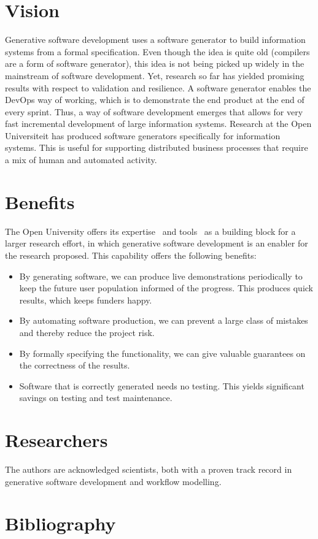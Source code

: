 \documentclass{elsarticle}
\begin{document}
\section{Vision}
   Generative software development uses a software generator to build information systems from a formal specification.
   Even though the idea is quite old (compilers are a form of software generator),
   this idea is not being picked up widely in the mainstream of software development.
   Yet, research so far has yielded promising results with respect to validation and resilience.
   A software generator enables the DevOps way of working, which is to demonstrate the end product at the end of every sprint.
   Thus, a way of software development emerges that allows for very fast incremental development of large information systems.
   Research at the Open Universiteit has produced software generators specifically for information systems.
   This is useful for supporting distributed business processes that require a mix of human and automated activity.

\section{Benefits}
    The Open University offers its expertise~\cite{JoostenRAMiCS2017,Steenvoorden2022} and tools~\cite{Joosten-JLAMP2018,10.1145/3354166.3354182} as a building block for a larger research effort,
    in which generative software development is an enabler for the research proposed.
    This capability offers the following benefits:
\begin{itemize}
    \item By generating software, we can produce live demonstrations periodically to keep the future user population informed of the progress.
    This produces quick results, which keeps funders happy.
    \item By automating software production, we can prevent a large class of mistakes and thereby reduce the project risk.
    \item By formally specifying the functionality, we can give valuable guarantees on the correctness of the results.
    \item Software that is correctly generated needs no testing. This yields significant savings on testing and test maintenance.
\end{itemize}

\section{Researchers}
    The authors are acknowledged scientists, both with a proven track record in generative software development and workflow modelling.

\newpage

\section{Bibliography}
    
    
\end{document}
